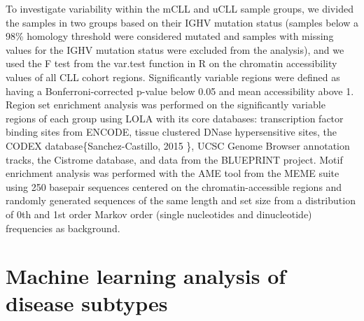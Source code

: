 \documentclass[10pt,]{article}
\begin{document}
To investigate variability within the mCLL and uCLL sample groups, we
divided the samples in two groups based on their IGHV mutation status
(samples below a 98\% homology threshold were considered mutated and
samples with missing values for the IGHV mutation status were excluded
from the analysis), and we used the F test from the var.test function in
R on the chromatin accessibility values of all CLL cohort regions.
Significantly variable regions were defined as having a
Bonferroni-corrected p-value below 0.05 and mean accessibility above 1.
Region set enrichment analysis was performed on the significantly
variable regions of each group using LOLA\citep{Sheffield2015} with its
core databases: transcription factor binding sites from
ENCODE\citep{Hoffman2013}, tissue clustered DNase hypersensitive
sites\citep{Sheffield2013}, the CODEX database\{Sanchez-Castillo, 2015
\}, UCSC Genome Browser annotation tracks\citep{Rosenbloom2015}, the
Cistrome database\citep{Liu2011}, and data from the BLUEPRINT
project\citep{Adams2012}. Motif enrichment analysis was performed with
the AME tool from the MEME suite\citep{Bailey2009} using 250 basepair
sequences centered on the chromatin-accessible regions and randomly
generated sequences of the same length and set size from a distribution
of 0th and 1st order Markov order (single nucleotides and dinucleotide)
frequencies as background.

\section{Machine learning analysis of disease
subtypes}\label{machine-learning-analysis-of-disease-subtypes}
\end{document}
